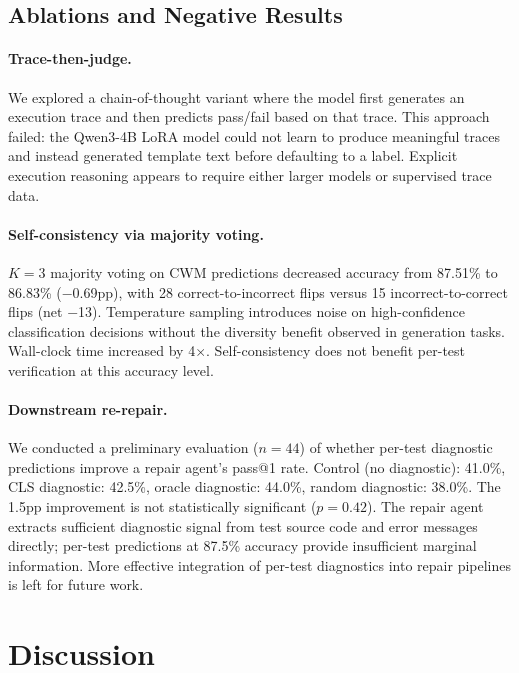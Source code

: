 \documentclass[11pt,a4paper]{article}
\begin{document}
\subsection{Ablations and Negative Results}

\paragraph{Trace-then-judge.}
We explored a chain-of-thought variant where the model first generates an execution trace and then predicts pass/fail based on that trace. This approach failed: the Qwen3-4B LoRA model could not learn to produce meaningful traces and instead generated template text before defaulting to a label. Explicit execution reasoning appears to require either larger models or supervised trace data.

\paragraph{Self-consistency via majority voting.}
$K{=}3$ majority voting on CWM predictions decreased accuracy from 87.51\% to 86.83\% ($-$0.69pp), with 28 correct-to-incorrect flips versus 15 incorrect-to-correct flips (net $-$13). Temperature sampling introduces noise on high-confidence classification decisions without the diversity benefit observed in generation tasks. Wall-clock time increased by 4$\times$. Self-consistency does not benefit per-test verification at this accuracy level.

\paragraph{Downstream re-repair.}
We conducted a preliminary evaluation ($n{=}44$) of whether per-test diagnostic predictions improve a repair agent's pass@1 rate. Control (no diagnostic): 41.0\%, CLS diagnostic: 42.5\%, oracle diagnostic: 44.0\%, random diagnostic: 38.0\%. The 1.5pp improvement is not statistically significant ($p{=}0.42$). The repair agent extracts sufficient diagnostic signal from test source code and error messages directly; per-test predictions at 87.5\% accuracy provide insufficient marginal information. More effective integration of per-test diagnostics into repair pipelines is left for future work.

\section{Discussion}
\end{document}
